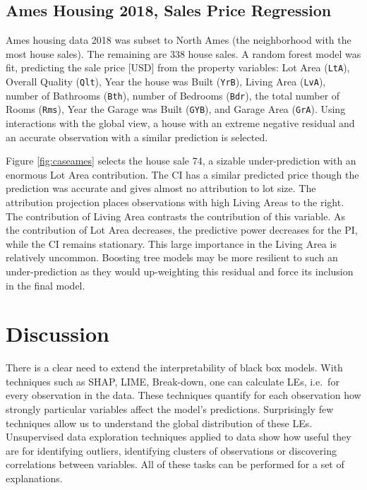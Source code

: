 \documentclass[
]{jss}
\begin{document}
\hypertarget{ames-housing-2018-sales-price-regression}{%
\subsection{Ames Housing 2018, Sales Price
Regression}\label{ames-housing-2018-sales-price-regression}}

Ames housing data 2018 \citep{de_cock_ames_2011, prevek18_ames_2018} was
subset to North Ames (the neighborhood with the most house sales). The
remaining are 338 house sales. A random forest model was fit, predicting
the sale price {[}USD{]} from the property variables: Lot Area
(\texttt{LtA}), Overall Quality (\texttt{Qlt}), Year the house was Built
(\texttt{YrB}), Living Area (\texttt{LvA}), number of Bathrooms
(\texttt{Bth}), number of Bedrooms (\texttt{Bdr}), the total number of
Rooms (\texttt{Rms}), Year the Garage was Built (\texttt{GYB}), and
Garage Area (\texttt{GrA}). Using interactions with the global view, a
house with an extreme negative residual and an accurate observation with
a similar prediction is selected.

Figure \ref{fig:caseames} selects the house sale 74, a sizable
under-prediction with an enormous Lot Area contribution. The CI has a
similar predicted price though the prediction was accurate and gives
almost no attribution to lot size. The attribution projection places
observations with high Living Areas to the right. The contribution of
Living Area contrasts the contribution of this variable. As the
contribution of Lot Area decreases, the predictive power decreases for
the PI, while the CI remains stationary. This large importance in the
Living Area is relatively uncommon. Boosting tree models may be more
resilient to such an under-prediction as they would up-weighting this
residual and force its inclusion in the final model.

\hypertarget{sec:cheemdiscussion}{%
\section{Discussion}\label{sec:cheemdiscussion}}

There is a clear need to extend the interpretability of black box
models. With techniques such as SHAP, LIME, Break-down, one can
calculate LEs, i.e.~for every observation in the data. These techniques
quantify for each observation how strongly particular variables affect
the model's predictions. Surprisingly few techniques allow us to
understand the global distribution of these LEs. Unsupervised data
exploration techniques applied to data show how useful they are for
identifying outliers, identifying clusters of observations or
discovering correlations between variables. All of these tasks can be
performed for a set of explanations.
\end{document}

